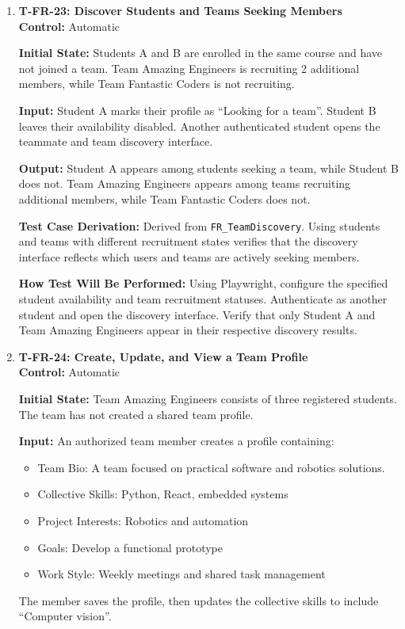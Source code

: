 \documentclass[12pt, titlepage]{article}
\begin{document}
\begin{enumerate}
\item \label{T-FR-23}\textbf{T-FR-23: Discover Students and Teams Seeking Members}\\

\textbf{Control:} Automatic

\textbf{Initial State:} Students A and B are enrolled in the same course and have not joined a team. Team Amazing Engineers is recruiting 2 additional members, while Team Fantastic Coders is not recruiting.

\textbf{Input:} Student A marks their profile as ``Looking for a team''. Student B leaves their availability disabled. Another authenticated student opens the teammate and team discovery interface.

\textbf{Output:} Student A appears among students seeking a team, while Student B does not. Team Amazing Engineers appears among teams recruiting additional members, while Team Fantastic Coders does not.

\textbf{Test Case Derivation:} Derived from \texttt{FR\_TeamDiscovery}. Using students and teams with different recruitment states verifies that the discovery interface reflects which users and teams are actively seeking members.

\textbf{How Test Will Be Performed:} Using Playwright, configure the specified student availability and team recruitment statuses. Authenticate as another student and open the discovery interface. Verify that only Student A and Team Amazing Engineers appear in their respective discovery results.

\item \label{T-FR-24}\textbf{T-FR-24: Create, Update, and View a Team Profile}\\

\textbf{Control:} Automatic

\textbf{Initial State:} Team Amazing Engineers consists of three registered students. The team has not created a shared team profile.

\textbf{Input:} An authorized team member creates a profile containing:
\begin{itemize}
    \item Team Bio: A team focused on practical software and robotics solutions.
    \item Collective Skills: Python, React, embedded systems
    \item Project Interests: Robotics and automation
    \item Goals: Develop a functional prototype
    \item Work Style: Weekly meetings and shared task management
\end{itemize}
The member saves the profile, then updates the collective skills to include ``Computer vision''.


\end{enumerate}
\end{document}

